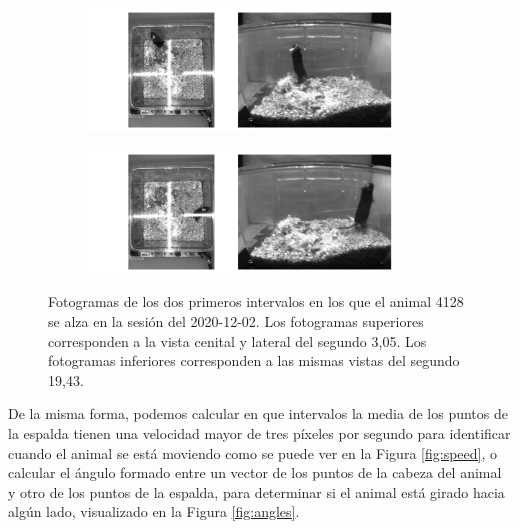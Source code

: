 \begin{figure}[h]
  \centering
  \begin{subfigure}{\textwidth}
    \centering
    \includegraphics[trim={2cm 0 0 0}, width=0.9\textwidth]{figures/rearing-4128-2020-12-02-0 03.05.pdf}
  \end{subfigure}
  \begin{subfigure}{\textwidth}
    \centering
    \includegraphics[trim={2cm 0 0 0}, width=0.9\textwidth]{figures/rearing-4128-2020-12-02-0 19.43.pdf}
  \end{subfigure}
  \caption[Fotogramas del animal alzándose.]{Fotogramas de los dos primeros intervalos en los que el animal 4128 se alza en la sesión del 2020-12-02. Los fotogramas superiores corresponden a la vista cenital y lateral del segundo 3,05. Los fotogramas inferiores corresponden a las mismas vistas del segundo 19,43.}
  \label{fig:rearing}
\end{figure}

De la misma forma, podemos calcular en que intervalos la media de los puntos de la espalda tienen una velocidad mayor de tres píxeles por segundo para identificar cuando el animal se está moviendo como se puede ver en la Figura \ref{fig:speed}, o calcular el ángulo formado entre un vector de los puntos de la cabeza del animal y otro de los puntos de la espalda, para determinar si el animal está girado hacia algún lado, visualizado en la Figura \ref{fig:angles}.

